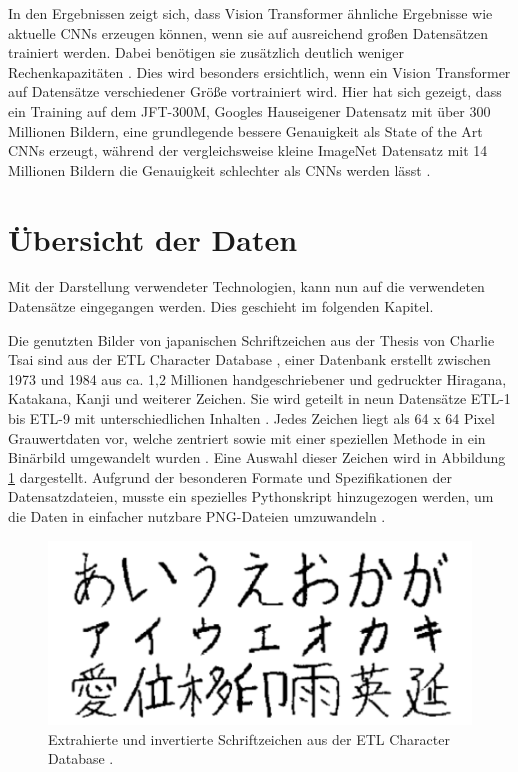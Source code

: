 \documentclass[twoside,a4paper]{IEEEtran}
\begin{document}
In den Ergebnissen zeigt sich, dass Vision Transformer ähnliche Ergebnisse wie aktuelle CNNs erzeugen können, wenn sie auf ausreichend großen Datensätzen trainiert werden. Dabei benötigen sie zusätzlich deutlich weniger Rechenkapazitäten \cite[S.5]{VIT}. Dies wird besonders ersichtlich, wenn ein Vision Transformer auf Datensätze verschiedener Größe vortrainiert wird. Hier hat sich gezeigt, dass ein Training auf dem JFT-300M, Googles Hauseigener Datensatz mit über 300 Millionen Bildern, eine grundlegende bessere Genauigkeit als State of the Art CNNs erzeugt, während der vergleichsweise kleine ImageNet Datensatz mit 14 Millionen Bildern \cite{IMAGENET} die Genauigkeit schlechter als CNNs werden lässt \cite{JFT}.
\section{Übersicht der Daten} %
Mit der Darstellung verwendeter Technologien, kann nun auf die verwendeten Datensätze eingegangen werden. Dies geschieht im folgenden Kapitel.

Die genutzten Bilder von japanischen Schriftzeichen aus der Thesis von Charlie Tsai sind aus der ETL Character Database \cite[S.2-3]{RHC}, einer Datenbank erstellt zwischen 1973 und 1984 aus ca. 1,2 Millionen handgeschriebener und gedruckter Hiragana, Katakana, Kanji und weiterer Zeichen. Sie wird geteilt in neun Datensätze ETL-1 bis ETL-9 mit unterschiedlichen Inhalten \cite{ETL}. Jedes Zeichen liegt als 64 x 64 Pixel Grauwertdaten vor, welche zentriert sowie mit einer speziellen Methode in ein Binärbild umgewandelt wurden \cite[S.3]{RHC}. Eine Auswahl dieser Zeichen wird in Abbildung \ref{kana} dargestellt. Aufgrund der besonderen Formate und Spezifikationen der Datensatzdateien, musste ein spezielles Pythonskript hinzugezogen werden, um die Daten in einfacher nutzbare PNG-Dateien umzuwandeln \cite{ETL_FORMATS}.
 
\begin{figure}[!htb]
	\includegraphics[width=\columnwidth]{kana}
	\caption{Extrahierte und invertierte Schriftzeichen aus der ETL Character Database \cite[S.1]{RHC}.}
	\label{kana}
\end{figure}
\end{document}
